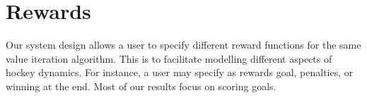 \documentclass[]{article}
\begin{document}










\section{Rewards} 

Our system design allows a user to specify different reward functions for the same value iteration algorithm. This is to facilitate modelling different aspects of hockey dynamics. For instance, a user may specify as rewards goal, penalties, or winning at the end. Most of our results focus on scoring goals. 
\end{document}
